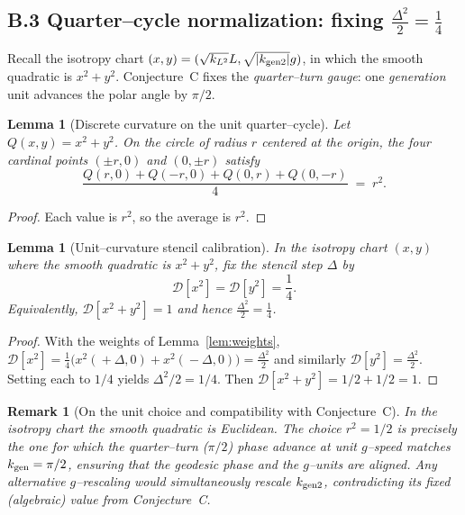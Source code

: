\documentclass[12pt]{article}
\newtheorem{lemma}[theorem]{Lemma}
\newtheorem{remark}[theorem]{Remark}
\numberwithin{equation}{section}
\begin{document}
\subsection*{B.3 \; Quarter–cycle normalization: fixing \texorpdfstring{$\frac{\Delta^2}{2}=\frac14$}{Δ²/2 = 1/4}}

Recall the isotropy chart $(x,y)=(\sqrt{k_{L^2}}L,\sqrt{|k_{\rm gen2}|}g)$, in which the smooth quadratic is $x^2+y^2$.
Conjecture~C fixes the \emph{quarter–turn gauge}: one \emph{generation} unit advances the polar angle by $\pi/2$.

\begin{lemma}[Discrete curvature on the unit quarter–cycle]\label{lem:quarter}
Let $Q(x,y)=x^2+y^2$. On the circle of radius $r$ centered at the origin, the four cardinal points $(\pm r,0)$ and $(0,\pm r)$ satisfy
\[
\frac{Q(r,0)+Q(-r,0)+Q(0,r)+Q(0,-r)}{4}\;=\;r^2.
\]
\end{lemma}

\begin{proof}
Each value is $r^2$, so the average is $r^2$.
\end{proof}

\begin{lemma}[Unit–curvature stencil calibration]\label{lem:DeltaNorm}
In the isotropy chart $(x,y)$ where the smooth quadratic is $x^2+y^2$, fix the stencil step $\Delta$ by
\[
\mathcal{D}[x^2]=\mathcal{D}[y^2]=\frac{1}{4}.
\]
Equivalently, $\mathcal{D}[x^2+y^2]=1$ and hence $\frac{\Delta^2}{2}=\frac{1}{4}$.
\end{lemma}
\begin{proof}
With the weights of Lemma~\ref{lem:weights}, $\mathcal{D}[x^2]=\tfrac14\big(x^2(\!+\Delta,0)+x^2(\!-\Delta,0)\big)=\tfrac{\Delta^2}{2}$ and similarly $\mathcal{D}[y^2]=\tfrac{\Delta^2}{2}$. Setting each to $1/4$ yields $\Delta^2/2=1/4$. Then $\mathcal{D}[x^2+y^2]=1/2+1/2=1$.
\end{proof}

\begin{remark}[On the unit choice and compatibility with Conjecture~C]
In the isotropy chart the smooth quadratic is Euclidean. The choice $r^2=1/2$ is precisely the one for which the quarter–turn ($\pi/2$) phase advance at unit $g$–speed matches $k_{\rm gen}=\pi/2$, ensuring that the geodesic phase and the $g$–units are aligned. Any alternative $g$–rescaling would simultaneously rescale $k_{\rm gen2}$, contradicting its fixed (algebraic) value from Conjecture~C.
\end{remark}
\end{document}
